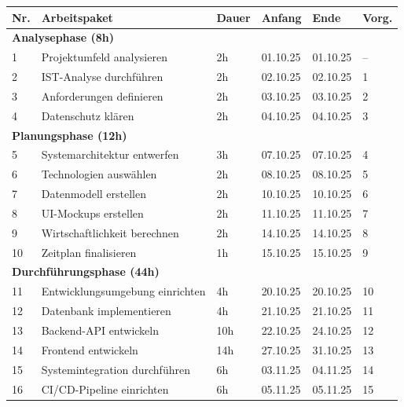 \begin{table}[H]
\centering
\footnotesize
{}
\begin{tabularx}{\textwidth}{|p{0.7cm}|X|p{1.2cm}|p{1.7cm}|p{1.7cm}|p{1.1cm}|}
\hline
\rowcolor{EDAGDunkelgrau!30}
\textbf{Nr.} & \textbf{Arbeitspaket} & \textbf{Dauer} & \textbf{Anfang} & \textbf{Ende} & \textbf{Vorg.} \\
\hline

\multicolumn{6}{|l|}{\cellcolor{EDAGDunkelgrau!10}\textbf{Analysephase (8h)}} \\
\hline
1 & Projektumfeld analysieren & 2h & 01.10.25 & 01.10.25 & -- \\
2 & IST-Analyse durchführen & 2h & 02.10.25 & 02.10.25 & 1 \\
3 & Anforderungen definieren & 2h & 03.10.25 & 03.10.25 & 2 \\
4 & Datenschutz klären & 2h & 04.10.25 & 04.10.25 & 3 \\
\hline

\multicolumn{6}{|l|}{\cellcolor{EDAGDunkelgrau!10}\textbf{Planungsphase (12h)}} \\
\hline
5 & Systemarchitektur entwerfen & 3h & 07.10.25 & 07.10.25 & 4 \\
6 & Technologien auswählen & 2h & 08.10.25 & 08.10.25 & 5 \\
7 & Datenmodell erstellen & 2h & 10.10.25 & 10.10.25 & 6 \\
8 & UI-Mockups erstellen & 2h & 11.10.25 & 11.10.25 & 7 \\
9 & Wirtschaftlichkeit berechnen & 2h & 14.10.25 & 14.10.25 & 8 \\
10 & Zeitplan finalisieren & 1h & 15.10.25 & 15.10.25 & 9 \\
\hline

\multicolumn{6}{|l|}{\cellcolor{EDAGDunkelgrau!10}\textbf{Durchführungsphase (44h)}} \\
\hline
11 & Entwicklungsumgebung einrichten & 4h & 20.10.25 & 20.10.25 & 10 \\
12 & Datenbank implementieren & 4h & 21.10.25 & 21.10.25 & 11 \\
13 & Backend-API entwickeln & 10h & 22.10.25 & 24.10.25 & 12 \\
14 & Frontend entwickeln & 14h & 27.10.25 & 31.10.25 & 13 \\
15 & Systemintegration durchführen & 6h & 03.11.25 & 04.11.25 & 14 \\
16 & CI/CD-Pipeline einrichten & 6h & 05.11.25 & 05.11.25 & 15 \\
\hline


\end{tabularx}
\end{table}
